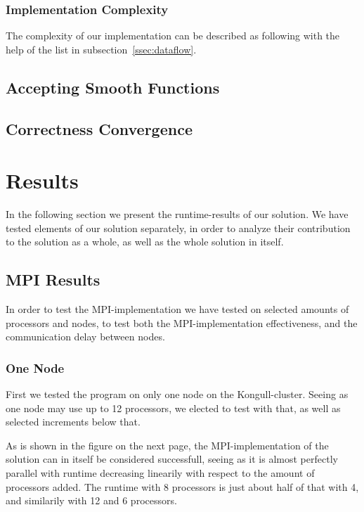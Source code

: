 \documentclass[fontsize=11pt,paper=a4,titlepage]{article}
\begin{document}
\subsubsection{Implementation Complexity}

The complexity of our implementation can be described as following with the help
of the list in subsection~\ref{ssec:dataflow}.




\subsection{Accepting Smooth Functions}

\subsection{Correctness Convergence}


\section{Results}
In the following section we present the runtime-results of our solution.
We have tested elements of our solution separately, in order to analyze their contribution to the solution as a whole, as well as the whole solution in itself.

\subsection{MPI Results}
In order to test the MPI-implementation we have tested on selected amounts of processors and nodes, to test both the MPI-implementation effectiveness, and the communication delay between nodes.

\subsubsection{One Node}
First we tested the program on only one node on the Kongull-cluster. Seeing as one node may use up to 12 processors, we elected to test with that, as well as selected increments below that. 

As is shown in the figure on the next page, the MPI-implementation of the solution can in itself be considered successfull, seeing as it is almost perfectly parallel with runtime decreasing linearily with respect to the amount of processors added. The runtime with 8 processors is just about half of that with 4, and similarily with 12 and 6 processors.
\end{document}
